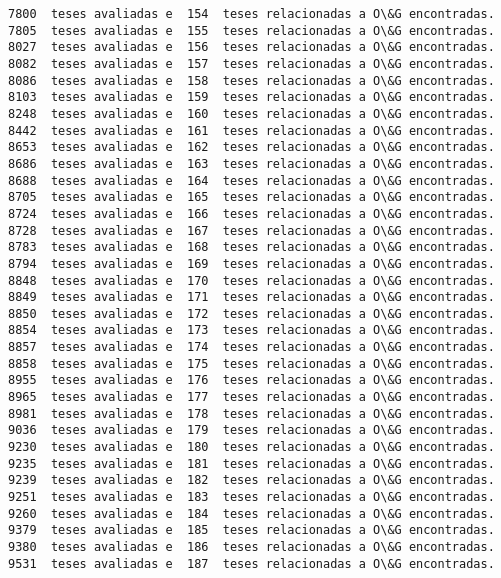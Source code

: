 \documentclass[11pt]{article}
\begin{document}
\begin{Verbatim}[commandchars=\\\{\}]
7800  teses avaliadas e  154  teses relacionadas a O\&G encontradas.
7805  teses avaliadas e  155  teses relacionadas a O\&G encontradas.
8027  teses avaliadas e  156  teses relacionadas a O\&G encontradas.
8082  teses avaliadas e  157  teses relacionadas a O\&G encontradas.
8086  teses avaliadas e  158  teses relacionadas a O\&G encontradas.
8103  teses avaliadas e  159  teses relacionadas a O\&G encontradas.
8248  teses avaliadas e  160  teses relacionadas a O\&G encontradas.
8442  teses avaliadas e  161  teses relacionadas a O\&G encontradas.
8653  teses avaliadas e  162  teses relacionadas a O\&G encontradas.
8686  teses avaliadas e  163  teses relacionadas a O\&G encontradas.
8688  teses avaliadas e  164  teses relacionadas a O\&G encontradas.
8705  teses avaliadas e  165  teses relacionadas a O\&G encontradas.
8724  teses avaliadas e  166  teses relacionadas a O\&G encontradas.
8728  teses avaliadas e  167  teses relacionadas a O\&G encontradas.
8783  teses avaliadas e  168  teses relacionadas a O\&G encontradas.
8794  teses avaliadas e  169  teses relacionadas a O\&G encontradas.
8848  teses avaliadas e  170  teses relacionadas a O\&G encontradas.
8849  teses avaliadas e  171  teses relacionadas a O\&G encontradas.
8850  teses avaliadas e  172  teses relacionadas a O\&G encontradas.
8854  teses avaliadas e  173  teses relacionadas a O\&G encontradas.
8857  teses avaliadas e  174  teses relacionadas a O\&G encontradas.
8858  teses avaliadas e  175  teses relacionadas a O\&G encontradas.
8955  teses avaliadas e  176  teses relacionadas a O\&G encontradas.
8965  teses avaliadas e  177  teses relacionadas a O\&G encontradas.
8981  teses avaliadas e  178  teses relacionadas a O\&G encontradas.
9036  teses avaliadas e  179  teses relacionadas a O\&G encontradas.
9230  teses avaliadas e  180  teses relacionadas a O\&G encontradas.
9235  teses avaliadas e  181  teses relacionadas a O\&G encontradas.
9239  teses avaliadas e  182  teses relacionadas a O\&G encontradas.
9251  teses avaliadas e  183  teses relacionadas a O\&G encontradas.
9260  teses avaliadas e  184  teses relacionadas a O\&G encontradas.
9379  teses avaliadas e  185  teses relacionadas a O\&G encontradas.
9380  teses avaliadas e  186  teses relacionadas a O\&G encontradas.
9531  teses avaliadas e  187  teses relacionadas a O\&G encontradas.
\end{Verbatim}
\end{document}
